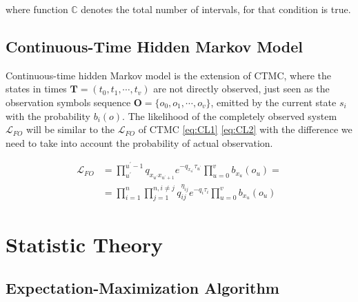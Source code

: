 \documentclass[thesis=M,english]{FITthesis}[2012/10/20]
\newcommand{\matr}[1]{\mathbf{#1}}
\begin{document}
where function $\mathbb{C}$ denotes the total number of intervals, for that condition is true.
    

\section{Continuous-Time Hidden Markov Model}

Continuous-time hidden Markov model is the extension of CTMC, where the states in times $\matr{T} = ( t_0, t_1, \cdots, t_{v} )$ are not directly observed, just seen as the observation symbols sequence $\matr{O} = \{  o_0, o_1, \cdots, o_{v} \}$, emitted by the current state $s_i$ with the probability $b_i(o)$.
The likelihood of the completely observed system  $\mathcal{L}_{FO}$ will be similar to the $\mathcal{L}_{FO}$ of CTMC \eqref{eq:CL1} \eqref{eq:CL2} with the difference we need to take into account the probability of actual observation.

\begin{equation}\label{eq:HMCL1}
\begin{aligned}  
 \mathcal{L}_{FO} &= \prod_{u^{'}}^{u^{'}-1} q_{x_{u^{'}} x_{u^{'}+1}} e^{ - q_{x_{u^{'}}} \tau_{u^{'}} } 
    \prod_{u=0}^v b_{ x_u }(o_u) = \\
    &= \prod_{i=1}^{n} \prod_{j=1}^{n, i \neq j} q_{ij}^{\eta_{ij} } e^{ - q_i \tau_i } \prod_{u=0}^v b_{x_u}(o_u)
\end{aligned}
\end{equation}

 

\chapter{Statistic Theory}


\section{Expectation-Maximization Algorithm}\label{ch:EM}


\end{document}
